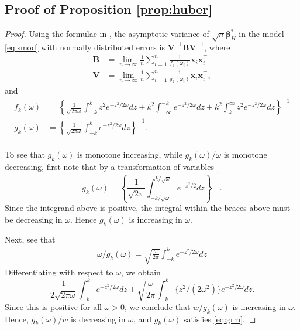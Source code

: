 \documentclass[12pt]{article}
\newcommand{\bl}[1]{{\mathbf #1}}
\newcommand{\bs}[1]{\boldsymbol #1}
\begin{document}
\subsection{{Proof of Proposition \ref{prop:huber}}}

\begin{proof}
Using the formulae in \cite{huber_robust_1964}, the asymptotic variance of $\sqrt{n} \bs{\beta}_{H}^*$ in the model \eqref{eq:smod} with normally distributed errors is $\bl{V}^{-1} \bl{B} \bl{V}^{-1}$, where
\begin{equation*}
    \begin{aligned}
        \bl{B} &= \lim_{n \rightarrow \infty} \frac{1}{n} \sum_{i=1}^n \frac{1}{f_{k}(\omega_i)} \bl{x}_i \bl{x}_i^\top \\
        \bl{V} &= \lim_{n \rightarrow \infty} \frac{1}{n} \sum_{i=1}^n \frac{1}{g_{k}(\omega_i)} \bl{x}_i \bl{x}_i^\top,
    \end{aligned}
\end{equation*}
and
\begin{equation*}
    \begin{aligned}
        f_k(\omega) &= \left\{\frac{1}{\sqrt{2\pi\omega}}\int_{-k}^k z^2 e^{-z^2/2\omega} dz + k^2 \int_{-\infty}^{-k} e^{-z^2/2\omega} dz + k^2 \int_{k}^\infty z^2 e^{-z^2/2\omega} dz\right\}^{-1}\\
        g_k(\omega) &= \left\{\frac{1}{\sqrt{2\pi\omega}}\int_{-k}^k e^{-z^2/2\omega} dz\right\}^{-1} .\\
    \end{aligned}
\end{equation*}

To see that $g_k(\omega)$ is monotone increasing, while $g_k(\omega) / \omega$ is monotone decreasing, first note that by a transformation of variables
\begin{equation*}
    g_k(\omega) = \left\{ \frac{1}{\sqrt{2 \pi}} \int_{-k/\sqrt{\omega}}^{k/\sqrt{\omega}} e^{-z^2/2} dz \right\}^{-1}.
\end{equation*}
Since the integrand above is positive, the integral within the braces above must be decreasing in $\omega$. Hence $g_k(\omega)$ is increasing in $\omega$.

Next, see that
\begin{equation*}
\begin{aligned}
    \omega / g_k(\omega) = \sqrt{\frac{\omega}{2 \pi}} \int_{-k}^k e^{-z^2/2\omega} dz
\end{aligned}
\end{equation*}
Differentiating with respect to $\omega$, we obtain
\begin{equation*}
    \frac{1}{2\sqrt{2\pi \omega}} \int_{-k}^k e^{-z^2/2\omega} dz + \sqrt{\frac{\omega}{2 \pi}} \int_{-k}^k \{z^2/(2\omega^2)\}e^{-z^2/2\omega} dz.
\end{equation*}
Since this is positive for all $\omega > 0$, we conclude that $w / g_k(\omega)$ is increasing in $\omega$.
Hence, $g_k(\omega)/w$ is decreasing in $\omega$, and $g_k(\omega)$ satisfies \eqref{eq:grm}.
\end{proof}
\end{document}
